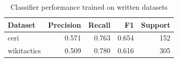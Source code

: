 \begin{table}[t]
\caption{Classifier performance trained on written datasets}
\label{tab:metrics_written}
\begin{tabular}{lrrrr}
\toprule
Dataset & Precision & Recall & F1 & Support \\
\midrule
ceri & 0.571 & 0.763 & 0.654 & 152 \\
wikitactics & 0.509 & 0.780 & 0.616 & 305 \\
\bottomrule
\end{tabular}
\end{table}
